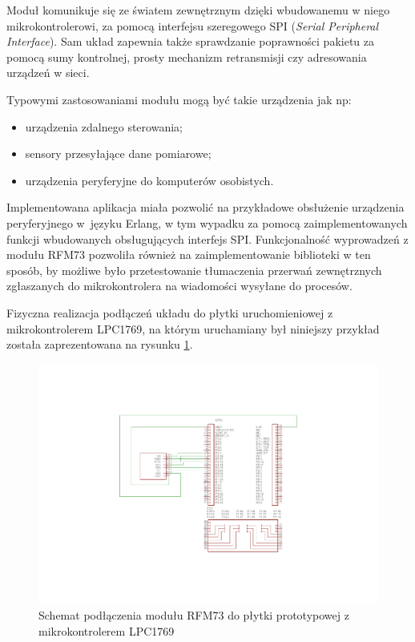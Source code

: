 Moduł komunikuje się ze światem zewnętrznym dzięki wbudowanemu w niego mikrokontrolerowi, za pomocą interfejsu szeregowego SPI (\emph{Serial Peripheral Interface}). Sam układ zapewnia także sprawdzanie poprawności pakietu za pomocą sumy kontrolnej, prosty mechanizm retransmisji czy adresowania urządzeń w sieci.

Typowymi zastosowaniami modułu mogą być takie urządzenia jak np:
\begin{itemize}
\item urządzenia zdalnego sterowania;
\item sensory przesyłające dane pomiarowe;
\item urządzenia peryferyjne do komputerów osobistych.
\end{itemize}

Implementowana aplikacja miała pozwolić na przykładowe obsłużenie urządzenia peryferyjnego w~języku Erlang, w tym wypadku za pomocą zaimplementowanych funkcji wbudowanych obsługujących interfejs SPI.
Funkcjonalność wyprowadzeń z modułu RFM73 pozwoliła również na zaimplementowanie biblioteki w ten sposób, by możliwe było przetestowanie tłumaczenia przerwań zewnętrznych zgłaszanych do mikrokontrolera na wiadomości wysyłane do procesów.

Fizyczna realizacja podłączeń układu do płytki uruchomieniowej z mikrokontrolerem LPC1769, na którym uruchamiany był niniejszy przykład została zaprezentowana na rysunku \ref{fig:examplerfm}.

\begin{figure}[h]
\centerline{\includegraphics[scale=1, clip, trim=0 40mm 0 40mm]{example_rfm}}
\caption{Schemat podłączenia modułu RFM73 do płytki prototypowej z mikrokontrolerem LPC1769}
\label{fig:examplerfm}
\end{figure}


